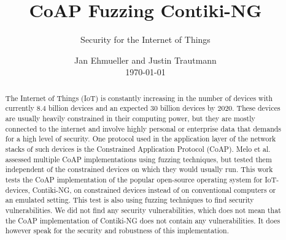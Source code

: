 \documentclass[sigconf]{acmart}
\begin{document}
\title{CoAP Fuzzing Contiki-NG}
\subtitle{Security for the Internet of Things}

\author{Jan Ehmueller and Justin Trautmann \\ \today}

\begin{abstract}
The Internet of Things (IoT) is constantly increasing in the number of devices with currently 8.4 billion devices and an expected 30 billion devices by 2020. These devices are usually heavily constrained in their computing power, but they are mostly connected to the internet and involve highly personal or enterprise data that demands for a high level of security. One protocol used in the application layer of the network stacks of such devices is the Constrained Application Protocol (CoAP).
Melo et al.~\cite{Melo2017RobustnessTO} assessed multiple CoAP implementations using fuzzing techniques, but tested them independent of the constrained devices on which they would usually run. This work tests the CoAP implementation of the popular open-source operating system for IoT-devices, Contiki-NG, on constrained devices instead of on conventional computers or an emulated setting. This test is also using fuzzing techniques to find security vulnerabilities.
We did not find any security vulnerabilities, which does not mean that the CoAP implementation of Contiki-NG does not contain any vulnerabilities. It does however speak for the security and robustness of this implementation.
\end{abstract}

\maketitle

\glsresetall









\balance



\end{document}
